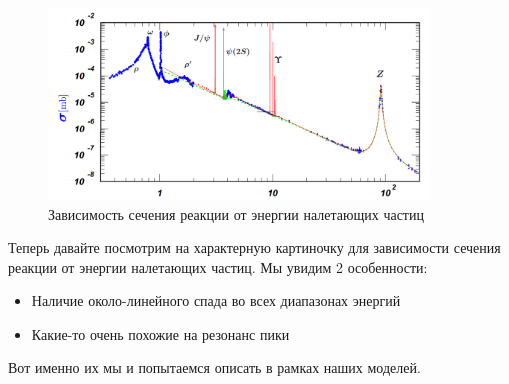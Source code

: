 \documentclass[12pt]{article}
\begin{document}
\begin{figure}[h]
    \centering
    \includegraphics[width=0.9\textwidth,height=\textheight,keepaspectratio]{Seminar_10/pics/pic_02_barn.PNG}
    \caption{Зависимость сечения реакции от энергии налетающих частиц}
    \label{fig:sem_10_barn}
\end{figure}

\noindent
Теперь давайте посмотрим на характерную картиночку для зависимости сечения реакции от энергии налетающих частиц. Мы увидим 2 особенности:
\begin{itemize}
    \item Наличие около-линейного спада во всех диапазонах энергий
    \item Какие-то очень похожие на резонанс пики
\end{itemize}
Вот именно их мы и попытаемся описать в рамках наших моделей.
\end{document}
